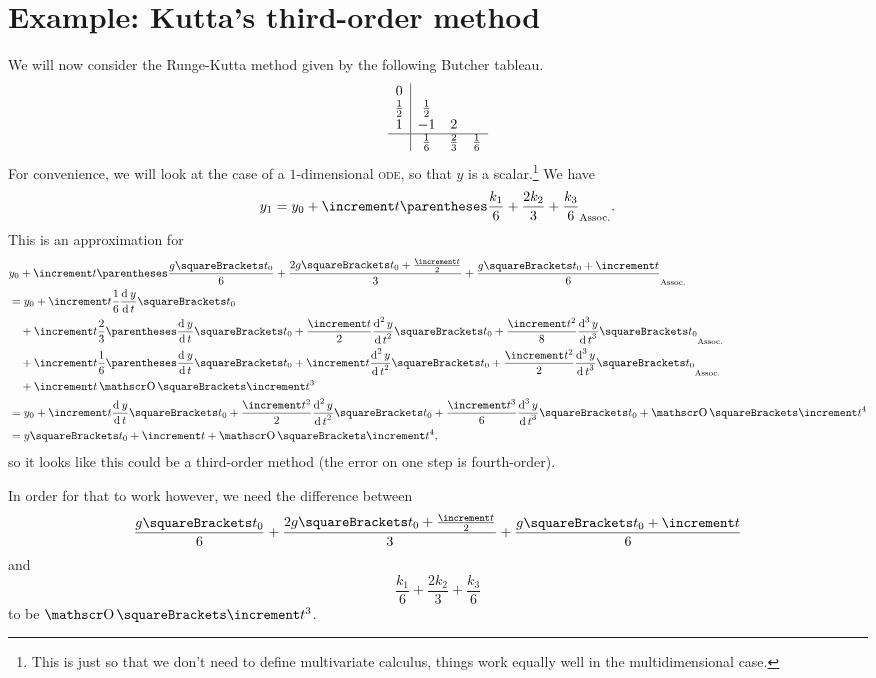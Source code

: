 \documentclass[10pt, a4paper, twoside]{basestyle}
\begin{document}
\section{Example: Kutta's third-order method}
We will now consider the Runge-Kutta method given by the following Butcher tableau.\[
\begin{array}{c | c c c}
0           &                  \\
\frac 1 2   & \frac 1 2    &   \\
1           & -1           & 2 \\
\hline
            &  \frac 1 6   & \frac 2 3 & \frac 1 6
\end{array}
\]
For convenience, we will look at the case of a $1$-dimensional \textsc{ode}, so that $y$ is a scalar.\footnote{This is just so that we don't need to define multivariate calculus, things work equally well in the multidimensional case.}
We have \[
y_1 = y_0 + \increment t \pa{\frac{k_1}{6} + \frac{2k_2}{3} + \frac{k_3}{6}}\text.
\]
This is an approximation for
\begin{align*}
& y_0 + \increment t \pa{\frac{g\of{t_0}}{6} 
          + \frac{2g\of{t_0 + \frac{\increment t}{2}}}{3} + \frac{g\of{t_0 + \increment t}}{6}}\\
&= y_0 + \increment t \frac{1}{6}\deriv t y \of{t_0} \\
 & \quad + \increment t \frac{2}{3}\pa{\deriv t y \of{t_0} + \frac{\increment t}{2} \deriv[2] t y \of{t_0} + \frac{\increment t^2}{8} \deriv[3] t y \of{t_0}} \\
 & \quad + \increment t \frac{1}{6}\pa{\deriv t y \of{t_0} + \increment t \deriv[2] t y \of{t_0} + \frac{\increment t^2}{2} \deriv[3] t y \of{t_0}} \\
 &\quad  + \increment t \BigO\of{\increment t^3} \\
&= y_0 + \increment t \deriv t y \of{t_0} + \frac{\increment t^2}{2} \deriv[2] t y \of{t_0} + \frac{\increment t^3}{6} \deriv[3] t y \of{t_0} + \BigO\of{\increment t^4} \\
&= y\of{t_0 + \increment t} + \BigO\of{\increment t^4}\text,
\end{align*}
so it looks like this could be a third-order method (the error on one step is fourth-order).

In order for that to work however, we need the difference between \[
\frac{g\of{t_0}}{6} + \frac{2g\of{t_0 + \frac{\increment t}{2}}}{3} + \frac{g\of{t_0 + \increment t}}{6}
\]and\[
\frac{k_1}{6} + \frac{2k_2}{3} + \frac{k_3}{6}
\]to be $\BigO\of{\increment t^3}$.
\end{document}
